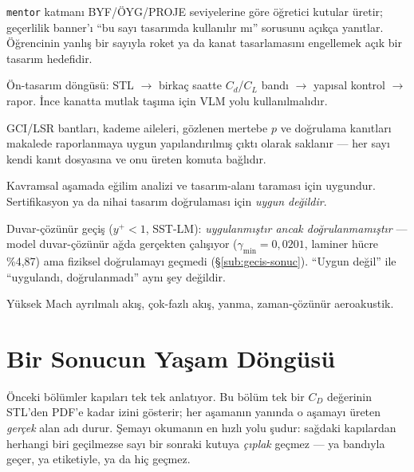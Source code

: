 \documentclass[11pt,a4paper]{article}
\begin{document}
\begin{description}\setlength\itemsep{2pt}
  \item[Eğitim (BİLSEM ve dengi).] \texttt{mentor} katmanı BYF/ÖYG/PROJE
        seviyelerine göre öğretici kutular üretir; geçerlilik banner'ı ``bu sayı
        tasarımda kullanılır mı'' sorusunu açıkça yanıtlar. Öğrencinin yanlış
        bir sayıyla roket ya da kanat tasarlamasını engellemek açık bir tasarım
        hedefidir.
  \item[Yarışma takımları.] Ön-tasarım döngüsü: STL $\rightarrow$ birkaç saatte
        $C_d$/$C_L$ bandı $\rightarrow$ yapısal kontrol $\rightarrow$ rapor.
        İnce kanatta mutlak taşıma için VLM yolu kullanılmalıdır.
  \item[Akademik çalışma.] GCI/LSR bantları, kademe aileleri, gözlenen mertebe
        $p$ ve doğrulama kanıtları makalede raporlanmaya uygun yapılandırılmış
        çıktı olarak saklanır --- her sayı kendi kanıt dosyasına ve onu üreten
        komuta bağlıdır.
  \item[Endüstriyel ön-tasarım.] Kavramsal aşamada eğilim analizi ve
        tasarım-alanı taraması için uygundur. Sertifikasyon ya da nihai tasarım
        doğrulaması için \emph{uygun değildir}.
  \item[Üretim-geçerlilik zarfı dışında.] Duvar-çözünür geçiş ($y^+<1$,
        SST-LM): \emph{uygulanmıştır ancak doğrulanmamıştır} --- model
        duvar-çözünür ağda gerçekten çalışıyor ($\gamma_{\min}=0{,}0201$,
        laminer hücre \%4{,}87) ama fiziksel doğrulamayı geçmedi
        (\S\ref{sub:gecis-sonuc}). ``Uygun değil'' ile ``uygulandı,
        doğrulanmadı'' aynı şey değildir.
  \item[Hiç uygulanmamış.] Yüksek Mach ayrılmalı akış, çok-fazlı akış,
        yanma, zaman-çözünür aeroakustik.
\end{description}

\section{Bir Sonucun Yaşam Döngüsü}
\label{sec:yasam}

Önceki bölümler kapıları tek tek anlatıyor. Bu bölüm tek bir $C_D$ değerinin
STL'den PDF'e kadar izini gösterir; her aşamanın yanında o aşamayı üreten
\emph{gerçek} alan adı durur. Şemayı okumanın en hızlı yolu şudur: sağdaki
kapılardan herhangi biri geçilmezse sayı bir sonraki kutuya \emph{çıplak}
geçmez --- ya bandıyla geçer, ya etiketiyle, ya da hiç geçmez.
\end{document}
